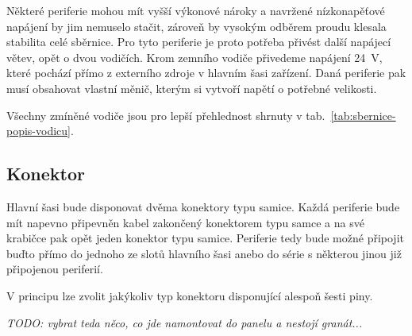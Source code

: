         Některé periferie mohou mít vyšší výkonové nároky a navržené nízkonapěťové napájení by jim nemuselo stačit, zároveň by vysokým odběrem proudu klesala stabilita celé sběrnice. Pro tyto periferie je proto potřeba přivést další napájecí větev, opět o dvou vodičích. Krom zemního vodiče přivedeme napájení \qty{24}{V}, které pochází přímo z externího zdroje v hlavním šasi zařízení. Daná periferie pak musí obsahovat vlastní měnič, kterým si vytvoří napětí o potřebné velikosti. 

        Všechny zmíněné vodiče jsou pro lepší přehlednost shrnuty v tab.~\ref{tab:sbernice-popis-vodicu}.
    
    \subsection{Konektor}
        Hlavní šasi bude disponovat dvěma konektory typu samice. Každá periferie bude mít napevno připevněn kabel zakončený konektorem typu samce a na své krabičce pak opět jeden konektor typu samice. Periferie tedy bude možné připojit buďto přímo do jednoho ze slotů hlavního šasi anebo do série s některou jinou již připojenou periferií. 

        V principu lze zvolit jakýkoliv typ konektoru disponující alespoň šesti piny.

        \textit{   TODO: vybrat teda něco, co jde namontovat do panelu a nestojí granát...} 